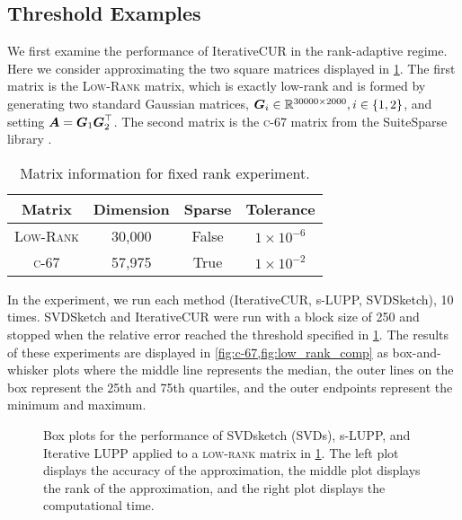 \subsection{Threshold Examples} \label{subsec:threshold}
We first examine the performance of IterativeCUR in the rank-adaptive regime. Here we consider approximating the two square matrices displayed in \cref{tab:rank-adapt}. The first matrix is the \textsc{Low-Rank} matrix, which is exactly low-rank and is formed by generating two standard Gaussian matrices, $\boldsymbol{G}_i \in \mathbb{R}^{30000 \times 2000}, i \in \{1,2\}$, and setting $\boldsymbol{A} = \boldsymbol{G}_1 \boldsymbol{G}_2^\top$. The second matrix is the \textsc{c-67} matrix from the SuiteSparse library \cite{davis2011university}. %
\begin{table}[h]
    \centering
    \caption{Matrix information for fixed rank experiment.} \label{tab:rank-adapt}
    \begin{tabular}{c|c|c|c}
    \toprule
    Matrix & Dimension & Sparse & Tolerance \\
   \hline
    \textsc{Low-Rank} & 30,000 & False & $1\times 10^{-6}$ \\
     \textsc{c-67} & 57,975 & True & $1\times10^{-2}$ \\
    \end{tabular}
  \end{table}

In the experiment, we run each method (IterativeCUR, s-LUPP, SVDSketch), 10 times. SVDSketch and IterativeCUR were run with a block size of 250 and stopped when the relative error reached the threshold specified in \cref{tab:rank-adapt}. The results of these experiments are displayed in \cref{fig:c-67,fig:low_rank_comp} as box-and-whisker plots where the middle line represents the median, the outer lines on the box represent the 25th and 75th quartiles, and the outer endpoints represent the minimum and maximum. 

\begin{figure}[h]
    \centering
    
    \caption{Box plots for the performance of SVDsketch (SVDs), s-LUPP, and Iterative LUPP applied to a \textsc{low-rank} matrix in \cref{tab:rank-adapt}. The left plot displays the accuracy of the approximation, the middle plot displays the rank of the approximation, and the right plot displays the computational time.}
    \label{fig:low_rank_comp}
\end{figure}

